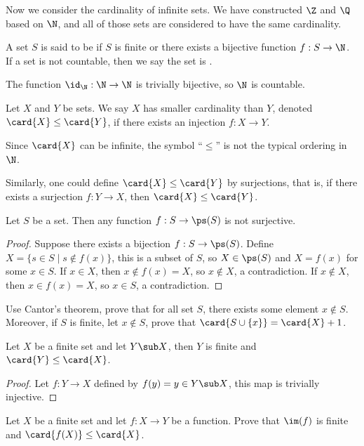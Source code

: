\documentclass[10pt]{article}
\begin{document}
Now we consider the cardinality of infinite sets. We have constructed $\Z$ and $\Q$ based on $\N$, and all of those sets are considered to have the same cardinality.
\begin{definition}
    A set $S$ is said to be  if $S$ is finite or there exists a bijective function $f:S\to\N$. If a set is not countable, then we say the set is .
\end{definition}
\par
The function ${\id}_{\N}:\N\to\N$ is trivially bijective, so $\N$ is countable.
\begin{definition}
    Let $X$ and $Y$ be sets. We say $X$ has smaller cardinality than $Y$, denoted $\card{X}\le\card{Y}$, if there exists an injection $f:X\to Y$.
\end{definition}
\begin{remark}
    Since $\card{X}$ can be infinite, the symbol ``$\le$'' is not the typical ordering in $\N$.
\end{remark}
\par
Similarly, one could define $\card{X}\le\card{Y}$ by surjections, that is, if there exists a surjection $f:Y\to X$, then $\card{X}\le\card{Y}$.
\begin{theorem}
    Let $S$ be a set. Then any function $f:S\to\ps(S)$ is not surjective.
\end{theorem}
\begin{proof}
    Suppose there exists a bijection $f:S\to\ps(S)$. Define $X=\{s\in S\mid s\notin f(x)\}$, this is a subset of $S$, so $X\in\ps(S)$ and $X=f(x)$ for some $x\in S$. If $x\in X$, then $x\notin f(x)=X$, so $x\notin X$, a contradiction. If $x\notin X$, then $x\in f(x)=X$, so $x\in S$, a contradiction.
\end{proof}
\begin{problem}
    Use Cantor's theorem, prove that for all set $S$, there exists some element $x\notin S$. Moreover, if $S$ is finite, let $x\notin S$, prove that $\card{S\cup\{x\}}=\card{X}+1$.
\end{problem}
\begin{proposition}
    Let $X$ be a finite set and let $Y\sub X$, then $Y$ is finite and $\card{Y}\le\card{X}$.
\end{proposition}
\begin{proof}
    Let $f:Y\to X$ defined by $f(y)=y\in Y\sub X$, this map is trivially injective.
\end{proof}
\begin{problem}
    Let $X$ be a finite set and let $f:X\to Y$ be a function. Prove that $\im(f)$ is finite and $\card{f(X)}\le\card{X}$.
\end{problem}
\end{document}
